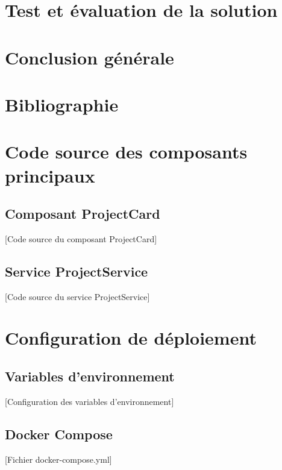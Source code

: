 \documentclass[12pt,a4paper]{report}
\begin{document}
\chapter{Test et évaluation de la solution}


\chapter*{Conclusion générale}


\newpage
{}
\chapter*{Bibliographie}


\appendix
\chapter{Code source des composants principaux}
\label{annexe:code}

\section{Composant ProjectCard}
\label{annexe:projectcard}
[Code source du composant ProjectCard]

\section{Service ProjectService}
\label{annexe:projectservice}
[Code source du service ProjectService]

\chapter{Configuration de déploiement}
\label{annexe:deployment}

\section{Variables d'environnement}
\label{annexe:env}
[Configuration des variables d'environnement]

\section{Docker Compose}
\label{annexe:docker}
[Fichier docker-compose.yml]
\end{document}
